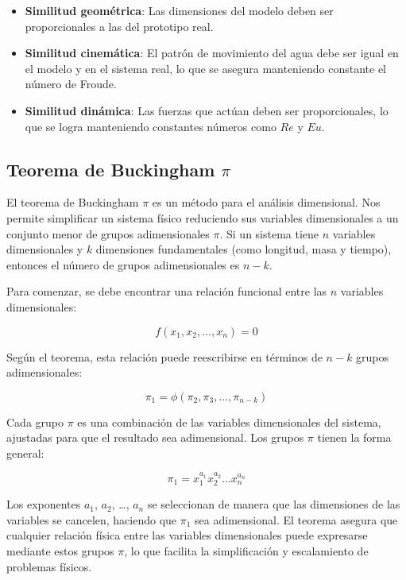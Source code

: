 \begin{itemize}
    \item \textbf{Similitud geométrica}: Las dimensiones del modelo deben ser proporcionales a las del prototipo real.
    \item \textbf{Similitud cinemática}: El patrón de movimiento del agua debe ser igual en el modelo y en el sistema real, lo que se asegura manteniendo constante el número de Froude.
    \item \textbf{Similitud dinámica}: Las fuerzas que actúan deben ser proporcionales, lo que se logra manteniendo constantes números como $Re$ y $Eu$.
\end{itemize}

\subsection{Teorema de Buckingham $\pi$}

El teorema de Buckingham $\pi$ es un método para el análisis dimensional. Nos permite simplificar un sistema físico reduciendo sus variables dimensionales a un conjunto menor de grupos adimensionales $\pi$. Si un sistema tiene $n$ variables dimensionales y $k$ dimensiones fundamentales (como longitud, masa y tiempo), entonces el número de grupos adimensionales es $n - k$.

Para comenzar, se debe encontrar una relación funcional entre las $n$ variables dimensionales:

\begin{equation}
f(x_1, x_2, \ldots, x_n) = 0
\end{equation}

Según el teorema, esta relación puede reescribirse en términos de $n - k$ grupos adimensionales:

\begin{equation}
\pi_1 = \phi(\pi_2, \pi_3, \ldots, \pi_{n-k})
\end{equation}

Cada grupo $\pi$ es una combinación de las variables dimensionales del sistema, ajustadas para que el resultado sea adimensional. Los grupos $\pi$ tienen la forma general:

\begin{equation}
\pi_1 = x_1^{a_1} x_2^{a_2} \ldots x_n^{a_n}
\end{equation}

Los exponentes $a_1$, $a_2$, \ldots, $a_n$ se seleccionan de manera que las dimensiones de las variables se cancelen, haciendo que $\pi_1$ sea adimensional. El teorema asegura que cualquier relación física entre las variables dimensionales puede expresarse mediante estos grupos $\pi$, lo que facilita la simplificación y escalamiento de problemas físicos.

